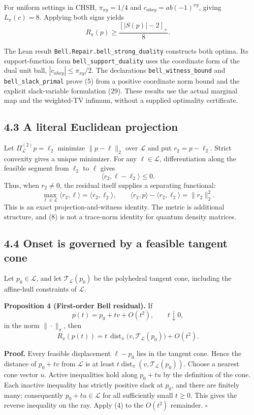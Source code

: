 \documentclass[
]{article}
\begin{document}
For uniform settings in CHSH, \(\pi_{xy}=1/4\) and \(c_{abxy}=ab(-1)^{xy}\), giving \(L_\pi(c)=8\). Applying both signs yields
\[
R_\pi(p)\ge\frac{[|S(p)|-2]_+}{8}.
\tag{7}
\]

The Lean result \texttt{Bell.Repair.bell\_strong\_duality} constructs both optima. Its support-function form \texttt{bell\_support\_duality} uses the coordinate form of the dual unit ball, \(|c_{abxy}|\le\pi_{xy}/2\). The declarations \texttt{bell\_witness\_bound} and \texttt{bell\_slack\_primal} prove (5) from a positive coordinate norm bound and the explicit slack-variable formulation (29). These results use the actual marginal map and the weighted-TV infimum, without a supplied optimality certificate.

\subsection{4.3 A literal Euclidean projection}\label{a-literal-euclidean-projection}

Let \(\Pi_{\mathcal L}^{(2)}p=\ell_2\) minimize \(\|p-\ell\|_2\) over \(\mathcal L\) and put \(r_2=p-\ell_2\). Strict convexity gives a unique minimizer. For any \(\ell\in\mathcal L\), differentiation along the feasible segment from \(\ell_2\) to \(\ell\) gives
\[
\langle r_2,\ell-\ell_2\rangle\le0.
\]
Thus, when \(r_2\ne0\), the residual itself supplies a separating functional:
\[
\max_{\ell\in\mathcal L}\langle r_2,\ell\rangle
=\langle r_2,\ell_2\rangle,
\qquad
\langle r_2,p\rangle-\langle r_2,\ell_2\rangle=\|r_2\|_2^2.
\tag{8}
\]
This is an exact projection-and-witness identity. The metric is additional structure, and (8) is not a trace-norm identity for quantum density matrices.

\subsection{4.4 Onset is governed by a feasible tangent cone}\label{onset-is-governed-by-a-feasible-tangent-cone}

Let \(p_0\in\mathcal L\), and let \(\mathcal T_{\mathcal L}(p_0)\) be the polyhedral tangent cone, including the affine-hull constraints of \(\mathcal L\).

\textbf{Proposition 4 (First-order Bell residual).} If
\[
p(t)=p_0+t v+O(t^2),\qquad t\downarrow0,
\]
in the norm \(\|\cdot\|_\pi\), then
\[
R_\pi(p(t))=
t\,\operatorname{dist}_\pi\bigl(v,\mathcal T_{\mathcal L}(p_0)\bigr)+O(t^2).
\tag{9}
\]

\textbf{Proof.} Every feasible displacement \(\ell-p_0\) lies in the tangent cone. Hence the distance of \(p_0+tv\) from \(\mathcal L\) is at least \(t\operatorname{dist}_\pi(v,\mathcal T_{\mathcal L}(p_0))\). Choose a nearest cone vector \(u\). Active inequalities hold along \(p_0+tu\) by the definition of the cone. Each inactive inequality has strictly positive slack at \(p_0\), and there are finitely many; consequently \(p_0+tu\in\mathcal L\) for all sufficiently small \(t\ge0\). This gives the reverse inequality on the ray. Apply (4) to the \(O(t^2)\) remainder. \(\square\)
\end{document}
